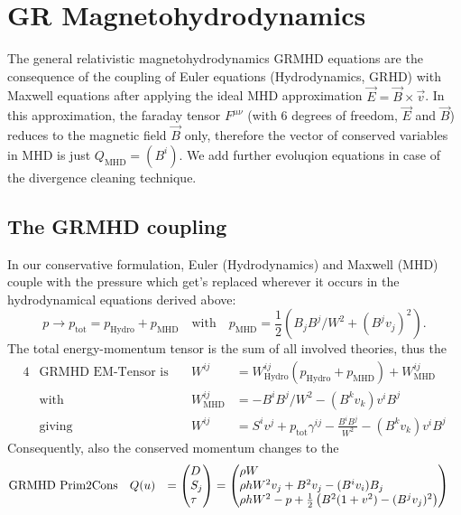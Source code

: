 \documentclass[a4paper]{article}
\newcommand{\desc}[1]{\text{#1}\quad}
\newcommand{\hydro}{\text{Hydro}}
\newcommand{\mhd}{\text{MHD}}
\newenvironment{pvector}{\begin{pmatrix*}[l]}{\end{pmatrix*}}
\begin{document}
\section{GR Magnetohydrodynamics}

The general relativistic magnetohydrodynamics GRMHD equations are
the consequence of the coupling of Euler equations 
(Hydrodynamics, GRHD) with Maxwell equations after applying the ideal MHD
approximation $\vec E = \vec B \times \vec v$. In this approximation,
the faraday tensor $F^{\mu\nu}$ (with 6 degrees of freedom, $\vec E$ 
and $\vec B$) reduces to the magnetic field $\vec B$ only, therefore the
vector of conserved variables in MHD is just $Q_\mhd = (B^i)$. We add
further evoluqion equations in case of the divergence cleaning technique.

\subsection{The GRMHD coupling}
In our conservative formulation, Euler (Hydrodynamics) and Maxwell (MHD)
couple with the pressure which get's replaced wherever it occurs in the
hydrodynamical equations derived above:
\begin{equation}
p \to p_\text{tot} = p_\hydro + p_\mhd
\quad\text{with}\quad
p_\mhd = \frac 12 \left( B_j B^j / W^2 + (B^j v_j)^2 \right).
\end{equation}
The total energy-momentum tensor is the sum of all involved theories,
thus the
\begin{alignat}{4}
& \desc{GRMHD EM-Tensor is}
& W^{ij} &= W^{ij}_\hydro(p_\hydro + p_\mhd) + W^{ij}_\mhd
\\
&\desc{with}
& W^{ij}_\mhd &= - B^i B^j / W^2 - (B^k v_k) v^i B^j
\\
&\desc{giving}
& W^{ij} &= 
S^i v^j + p_\text{tot} \gamma^{ij} - \frac{B^i B^j}{W^2} - (B^k v_k)v^i B^j
\end{alignat}
Consequently, also the conserved momentum changes to the 
\begin{alignat}{3}
\desc{GRMHD Prim2Cons}
&
Q(u)
&=
\begin{pvector}
D \\
S_j \\
\tau
\end{pvector}
&=
\begin{pvector}
\rho W \\
\rho h W^2 v_j + B^2 v_j - (B^i v_i) B_j \\
\rho h W^2 - p + \frac 12 \left( B^2 (1 + v^2) - (B^j v_j)^2 \right)
\end{pvector}
\label{eq.grhd.Qu}
\end{alignat}
\end{document}
